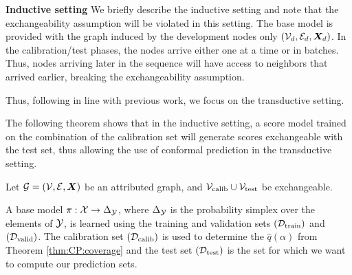 \noindent \textbf{Inductive setting}
We briefly describe the inductive setting and note that the exchangeability assumption will be violated in this setting.
The base model is provided with the graph induced by the development nodes only $({\mathcal{V}}_d, {\mathcal{E}}_d, {\bm{X}}_d)$.
In the calibration/test phases, the nodes arrive either one at a time or in batches.
Thus, nodes arriving later in the sequence will have access to neighbors that arrived earlier, breaking the exchangeability assumption.

Thus, following in line with previous work, we focus on the transductive setting.

The following theorem shows that in the inductive setting, a score model trained on the combination of the calibration set will generate scores exchangeable with the test set, thus allowing the use of conformal prediction in the transductive setting.

\begin{theorem}
    Let ${\mathcal{G}} = ({\mathcal{V}}, {\mathcal{E}}, {\bm{X}})$ be an attributed graph, and ${\mathcal{V}}_{\text{calib}} \cup {\mathcal{V}}_{\text{test}}$ be exchangeable.
    \label{thm:exchangeability}
\end{theorem}


%
A base model $\pi: {\mathcal{X}} \to \Delta_{{\mathcal{Y}}}$, where $\Delta_{{\mathcal{Y}}}$ is the probability simplex over the elements of ${\mathcal{Y}}$, is learned using the training and validation sets $({\mathcal{D}}_{\text{train}})$ and $({\mathcal{D}}_{\text{valid}})$. The calibration set $({\mathcal{D}}_{\text{calib}})$ is used to determine the $\hat{q}(\alpha)$ from Theorem \ref{thm:CP:coverage} and the test set $({\mathcal{D}}_{\text{test}})$ is the set for which we want to compute our prediction sets.